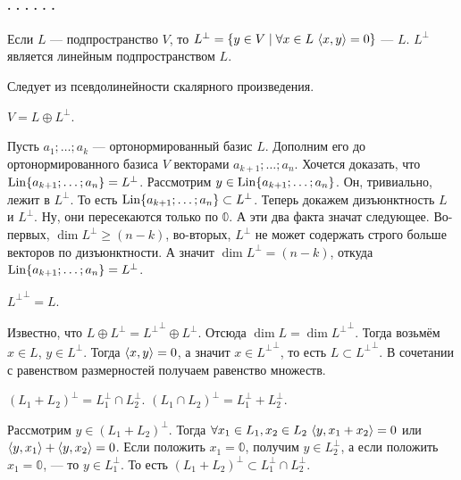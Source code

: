 \documentclass{article}
\begin{document}
    \paragraph{. . . . . .}
    \begin{itemize}
        \dfn Если $L$ --- подпространство $V$, то $L^\perp=\{y\in V\mid\forall x\in L~{\left\langle{x},{y}\right\rangle}=0\}$ ---  $L$.
        \thm $L^\perp$ является линейным подпространством $L$.
        \begin{Proof}
            Следует из псевдолинейности скалярного произведения.
        \end{Proof}
        \thm $V=L\oplus L^\perp$.
        \begin{Proof}
            Пусть $a_1;\ldots;a_k$ --- ортонормированный базис $L$. Дополним  его до ортонормированного базиса $V$ векторами $a_{k+1};\ldots;a_n$. Хочется доказать, что $\operatorname{Lin}\{a_{k+1};\ldots;a_n\}=L^\perp$. Рассмотрим $y\in\operatorname{Lin}\{a_{k+1};\ldots;a_n\}$. Он, тривиально, лежит в $L^\perp$. То есть $\operatorname{Lin}\{a_{k+1};\ldots;a_n\}\subset L^\perp$. Теперь докажем дизъюнктность $L$ и $L^\perp$. Ну, они пересекаются только по $\mathbb0$. А эти два факта значат следующее. Во-первых, $\dim L^\perp\geqslant(n-k)$, во-вторых, $L^\perp$ не может содержать строго больше векторов по дизъюнктности. А значит $\dim L^\perp=(n-k)$, откуда $\operatorname{Lin}\{a_{k+1};\ldots;a_n\}=L^\perp$.
        \end{Proof}
        \thm ${L^\perp}^\perp=L$.
        \begin{Proof}
            Известно, что $L\oplus L^\perp={L^\perp}^\perp\oplus L^\perp$. Отсюда $\dim L=\dim{L^\perp}^\perp$. Тогда возьмём $x\in L$, $y\in L^\perp$. Тогда ${\left\langle{x},{y}\right\rangle}=0$, а значит $x\in{L^\perp}^\perp$, то есть $L\subset{L^\perp}^\perp$. В сочетании с равенством размерностей получаем равенство множеств.
        \end{Proof}
        \thm $(L_1+L_2)^\perp=L_1^\perp\cap L_2^\perp$. $(L_1\cap L_2)^\perp=L_1^\perp+L_2^\perp$.
        \begin{Proof}
            Рассмотрим $y\in(L_1+L_2)^\perp$. Тогда $\forall x_1\in L_1,x_2\in L_2~{\left\langle{y},{x_1+x_2}\right\rangle}=0$ или ${\left\langle{y},{x_1}\right\rangle}+{\left\langle{y},{x_2}\right\rangle}=0$. Если положить $x_1=\mathbb0$, получим $y\in L_2^\perp$, а если положить $x_1=\mathbb0$, --- то $y\in L_1^\perp$. То есть $(L_1+L_2)^\perp\subset L_1^\perp\cap L_2^\perp$.\\

\end{Proof}
\end{itemize}
\end{document}
